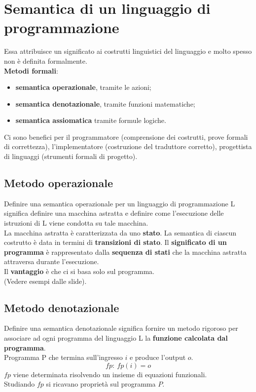 \documentclass[12pt]{report}
\begin{document}
	\section{Semantica di un linguaggio di programmazione}
	Essa attribuisce un significato ai costrutti linguistici del linguaggio e molto spesso non è definita formalmente. \\
	\textbf{Metodi formali}:
	\begin{itemize}
		\item\textbf{semantica operazionale}, tramite le azioni;
		\item \textbf{semantica denotazionale}, tramite funzioni matematiche;
		\item \textbf{semantica assiomatica} tramite formule logiche.
	\end{itemize}
	Ci sono benefici per il programmatore (comprensione dei costrutti, prove formali di correttezza), l'implementatore (costruzione del traduttore corretto), progettista di linguaggi (strumenti formali di progetto). \\
	\subsection{Metodo operazionale}
	Definire una semantica operazionale per un linguaggio di programmazione L significa definire una macchina astratta e definire come l'esecuzione delle istruzioni di L viene condotta su tale macchina. \\
	La macchina astratta è caratterizzata da uno \textbf{stato}. La semantica di ciascun costrutto è data in termini di \textbf{transizioni di stato}. Il \textbf{significato di un programma} è rappresentato dalla \textbf{sequenza di stati} che la macchina astratta attraversa durante l'esecuzione. \\
	Il \textbf{vantaggio} è che ci si basa solo sul programma. \\
	(Vedere esempi dalle slide).
	\subsection{Metodo denotazionale}
	Definire una semantica denotazionale significa fornire un metodo rigoroso per associare ad ogni programma del linguaggio L la \textbf{funzione calcolata dal programma}. \\
	Programma P che termina sull'ingresso $i$ e produce l'output $o$.
	\[
	fp:\ fp(i) = o
	\]
	$fp$ viene determinata risolvendo un insieme di equazioni funzionali. \\
	Studiando $fp$ si ricavano proprietà sul programma $P$.
\end{document}
